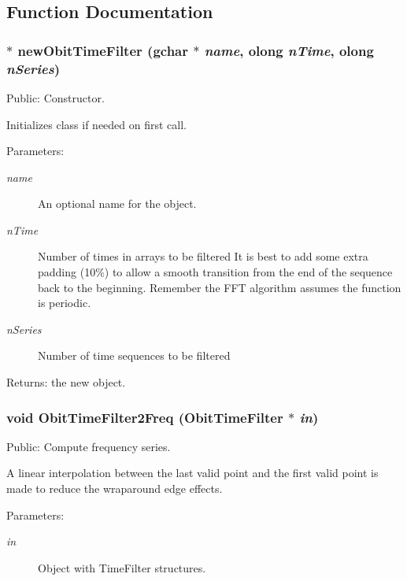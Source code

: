 \subsection{Function Documentation}
\subsubsection{$\ast$ new\-Obit\-Time\-Filter (gchar $\ast$ {\em name}, {\bf olong} {\em n\-Time}, {\bf olong} {\em n\-Series})}\label{ObitTimeFilter_8h_a17}


Public: Constructor. 

Initializes class if needed on first call. \begin{Desc}
\item[Parameters:]
\begin{description}
\item[{\em name}]An optional name for the object. \item[{\em n\-Time}]Number of times in arrays to be filtered It is best to add some extra padding (10\%) to allow a smooth transition from the end of the sequence back to the beginning. Remember the FFT algorithm assumes the function is periodic. \item[{\em n\-Series}]Number of time sequences to be filtered \end{description}
\end{Desc}
\begin{Desc}
\item[Returns:]the new object. \end{Desc}
\subsubsection{\setlength{\rightskip}{0pt plus 5cm}void Obit\-Time\-Filter2Freq ({\bf Obit\-Time\-Filter} $\ast$ {\em in})}\label{ObitTimeFilter_8h_a22}


Public: Compute frequency series. 

A linear interpolation between the last valid point and the first valid point is made to reduce the wraparound edge effects. \begin{Desc}
\item[Parameters:]
\begin{description}
\item[{\em in}]Object with Time\-Filter structures. \end{description}
\end{Desc}
